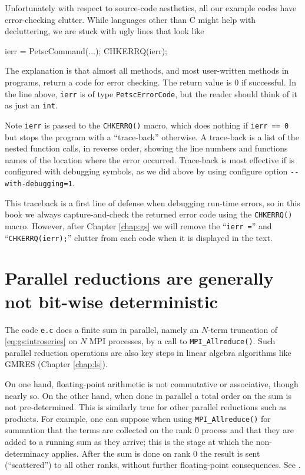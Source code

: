 Unfortunately with respect to source-code aesthetics, all our \PETSc example codes have error-checking clutter.  While languages other than C might help with decluttering, we are stuck with ugly lines that look like
\begin{code}
ierr = PetscCommand(...); CHKERRQ(ierr);
\end{code}
The explanation is that almost all \PETSc methods, and most user-written methods in \PETSc programs, return a code for error checking.  The return value is $0$ if successful.  In the line above, \texttt{ierr} is of type \texttt{PetscErrorCode}, but the reader should think of it as just an \texttt{int}.

Note \texttt{ierr} is passed to the \texttt{CHKERRQ()} macro, which does nothing if \texttt{ierr == 0} but stops the program with a ``trace-back'' otherwise.  A trace-back is a list of the nested function calls, in reverse order, showing the line numbers and functions names of the location where the error occurred.  Trace-back is most effective if \PETSc is configured with debugging symbols, as we did above by using configure option \verb|--with-debugging=1|.

This traceback is a first line of defense when debugging run-time errors, so in this book we always capture-and-check the returned error code using the \texttt{CHKERRQ()} macro.  However, after Chapter \ref{chap:gs} we will remove the ``\texttt{ierr =}'' and ``\texttt{CHKERRQ(ierr);}'' clutter from each code when it is displayed in the text.


\section{Parallel reductions are generally not bit-wise deterministic}

The code \texttt{e.c} does a finite sum in parallel, namely an $N$-term truncation of \eqref{eq:gs:introseries} on $N$ MPI processes, by a call to \texttt{MPI\_Allreduce()}.  Such parallel reduction operations are also key steps in linear algebra algorithms like GMRES (Chapter \ref{chap:ls}).

On one hand, floating-point arithmetic is not commutative or associative, though nearly so.  On the other hand, when done in parallel a total order on the sum is not pre-determined.  This is similarly true for other parallel reductions such as products.  For example, one can suppose when using \texttt{MPI\_Allreduce()} for summation that the terms are collected on the rank $0$ process and that they are added to a running sum as they arrive; this is the stage at which the non-determinacy applies.  After the sum is done on rank $0$ the result is sent (``scattered'') to all other ranks, without further floating-point consequences.  See \citep{Groppetal1999}.

